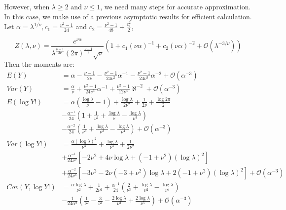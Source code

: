 \documentclass[aoas]{imsart}
\theoremstyle{plain}
\theoremstyle{remark}
\begin{document}
\begin{appendix}
However, when $\lambda \geq 2$ and $\nu \leq 1$, we need many steps for accurate approximation. In this case, we make use of a previous asymptotic results for efficient calculation. Let $\alpha = \lambda^{1/\nu}, c_1 = \frac{\nu^2-1}{24}$ and $c_2 = \frac{\nu^2 - 1}{48} + \frac{c_1^2}{2}$,

\begin{equation}
	Z(\lambda, \nu)=\frac{e^{\nu\alpha}}{\lambda^{\frac{\nu-1}{2\nu}}(2\pi)^\frac{\nu-1}{2}\sqrt{\nu}}(1+c_1(\nu\alpha)^{-1} + c_2(\nu\alpha)^{-2} + \mathcal{O}(\lambda^{-3/\nu}))
\end{equation}
Then the moments are:
\begin{align}
	E(Y) &= \alpha - \frac{\nu-1}{2\nu} - \frac{\nu^2-1}{24\nu^2}\alpha^{-1}-\frac{\nu^2-1}{24\nu^3}\alpha^{-2} + \mathcal{O}(\alpha^{-3})\\
	Var(Y) &= \frac{\alpha}{\nu} + \frac{\nu^2-1}{24\nu^3}\alpha^{-1} + \frac{\nu^2-1}{12\nu^4}\aleph^{-2} + \mathcal{O}(\alpha^{-3}) \nonumber\\
	E(\log Y!) &= \alpha\left(\frac{\log\lambda}{\nu} - 1\right) + \frac{\log\lambda}{2\nu^2} + \frac{1}{2\nu} + \frac{\log 2\pi}{2} \nonumber \\
	&- \frac{\alpha^{-1}}{24}\left(1 + \frac{1}{\nu^2} + \frac{\log\lambda}{\nu} - \frac{\log\lambda}{\nu^3}\right) \nonumber\\
	&- \frac{\alpha^{-2}}{24}\left(\frac{1}{\nu^3} + \frac{\log\lambda}{\nu^2} - \frac{\log \lambda}{\nu^4}\right) + \mathcal{O}(\alpha^{-3}) \nonumber \\
	Var(\log Y!) &= \frac{\alpha(\log\lambda)^2}{\nu^3} + \frac{\log\lambda}{\nu^3} + \frac{1}{2\nu^2} \nonumber\\
	&+ \frac{\alpha^{-1}}{24\nu^5}[-2\nu^2 + 4\nu\log\lambda + (-1 + \nu^2)(\log\lambda)^2] \nonumber\\
	&+ \frac{\alpha^{-2}}{24\nu^6}[-3\nu^2 - 2\nu(-3 + \nu^2)\log\lambda + 2(-1 + \nu^2)(\log\lambda)^2] + \mathcal{O}(\alpha^{-3}) \nonumber \\
	Cov(Y, \log Y!) &= \frac{\alpha\log\lambda}{\nu^2} + \frac{1}{2\nu^2} + \frac{\alpha^{-1}}{24}\left(\frac{2}{\nu^3} + \frac{\log\lambda}{\nu^2} - \frac{\log\lambda}{\nu^4}\right) \nonumber\\
	&-\frac{1}{24\alpha^2}\left(\frac{1}{\nu^2} - \frac{3}{\nu^4} - \frac{2\log\lambda}{\nu^3} + \frac{2\log\lambda}{\nu^5}\right) + \mathcal{O}(\alpha^{-3}) \nonumber
\end{align}



\end{appendix}
\end{document}
